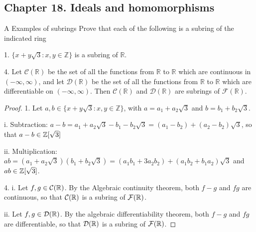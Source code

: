 \subsection*{Chapter 18. Ideals and homomorphisms}


\begin{exercise}{A Examples of subrings}
  Prove that each of the following is a subring of the indicated ring

  1. $\{x+y\sqrt{3}:x,y\in\mathbb{Z}\}$ is a subring of $\mathbb{R}$.

  4. Let $\mathcal{C}(\mathbb{R})$ be the set of all the functions from $\mathbb{R}$ to $\mathbb{R}$ which are continuous in $(-\infty,\infty)$, and let $\mathcal{D}(\mathbb{R})$ be the set of all the functions from $\mathbb{R}$ to $\mathbb{R}$ which are differentiable on $(-\infty,\infty)$. Then $\mathcal{C}(\mathbb{R})$ and $\mathcal{D}(\mathbb{R})$ are subrings of $\mathcal{F}(\mathbb{R})$.
\end{exercise}
\begin{proof}
 1. Let $a, b\in \{x+y\sqrt{3}:x,y\in\mathbb{Z}\}$, with $a=a_{1}+a_{2}\sqrt{3}$ and $b=b_{1}+b_{2}\sqrt{3}$.
  
  i. Subtraction: $a-b=a_{1}+a_{2}\sqrt{3}-b_{1}-b_{2}\sqrt{3} =(a_{1}-b_{2})+(a_{2}-b_{2})\sqrt{3}$, so that $a-b\in \mathbb{Z}[\sqrt{3}]$
  
  ii. Multiplication: $ab= (a_{1}+a_{2}\sqrt{3})(b_{1}+b_{2}\sqrt{3})= (a_{1}b_{1}+3a_{2}b_{2})+(a_{1}b_{2}+b_{1}a_{2})\sqrt{3}$ and $ab\in\mathbb{Z}[\sqrt{3}]$.

 4. i. Let $f,g\in\mathcal{C}(\mathbb{R})$. By the Algebraic continuity theorem, both $f-g$ and $fg$ are continuous, so that $\mathcal{C}(\mathbb{R})$ is a subring of $\mathcal{F}(\mathbb{R})$.
 
 ii. Let $f,g\in\mathcal{D}(\mathbb{R})$. By the algebraic differentiability theorem, both $f-g$ and $fg$ are differentiable, so that $\mathcal{D}(\mathbb{R})$ is a subring of $\mathcal{F}(\mathbb{R})$. 
\end{proof}


